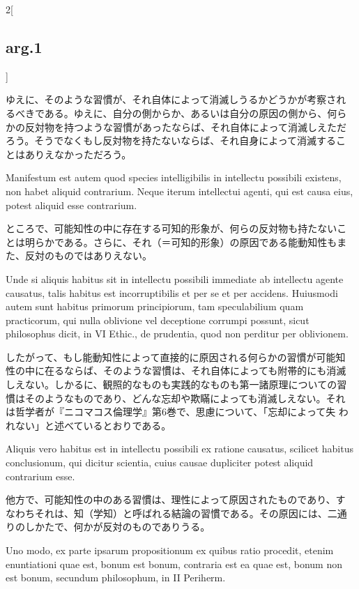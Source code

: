 \documentclass[paper=a4paper,fontsize=10pt,jafontsize=9pt,titlepage]{jlreq}
\begin{document}
\begin{paracol}{2}[\subsection{arg.1}]
\switchcolumn

ゆえに、そのような習慣が、それ自体によって消滅しうるかどうかが考察され
るべきである。ゆえに、自分の側からか、あるいは自分の原因の側から、何ら
かの反対物を持つような習慣があったならば、それ自体によって消滅しえただ
ろう。そうでなくもし反対物を持たないならば、それ自身によって消滅するこ
とはありえなかっただろう。

\switchcolumn*

Manifestum est autem quod species intelligibilis in intellectu
possibili existens, non habet aliquid contrarium. Neque iterum
intellectui agenti, qui est causa eius, potest aliquid esse
contrarium.

\switchcolumn

ところで、可能知性の中に存在する可知的形象が、何らの反対物も持たないこ
とは明らかである。さらに、それ（＝可知的形象）の原因である能動知性もま
た、反対のものではありえない。

\switchcolumn*

Unde si aliquis habitus sit in intellectu possibili immediate ab
intellectu agente causatus, talis habitus est incorruptibilis et per
se et per accidens. Huiusmodi autem sunt habitus primorum
principiorum, tam speculabilium quam practicorum, qui nulla oblivione
vel deceptione corrumpi possunt, sicut philosophus dicit, in VI
Ethic., de prudentia, quod non perditur per oblivionem.

\switchcolumn

したがって、もし能動知性によって直接的に原因される何らかの習慣が可能知
性の中に在るならば、そのような習慣は、それ自体によっても附帯的にも消滅
しえない。しかるに、観照的なものも実践的なものも第一諸原理についての習
慣はそのようなものであり、どんな忘却や欺瞞によっても消滅しえない。それ
は哲学者が『ニコマコス倫理学』第6巻で、思慮について、「忘却によって失
われない」と述べているとおりである。

\switchcolumn*

Aliquis vero habitus est in intellectu possibili ex ratione causatus,
scilicet habitus conclusionum, qui dicitur scientia, cuius causae
dupliciter potest aliquid contrarium esse.

\switchcolumn

他方で、可能知性の中のある習慣は、理性によって原因されたものであり、す
なわちそれは、知（学知）と呼ばれる結論の習慣である。その原因には、二通
りのしかたで、何かが反対のものでありうる。

\switchcolumn*

Uno modo, ex parte ipsarum propositionum ex quibus ratio procedit,
etenim enuntiationi quae est, bonum est bonum, contraria est ea quae
est, bonum non est bonum, secundum philosophum, in II Periherm.


\end{paracol}
\end{document}
